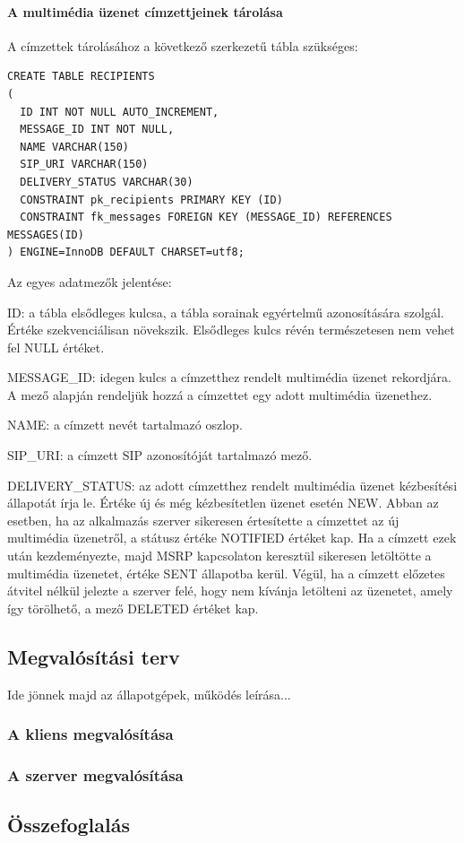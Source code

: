 \paragraph*{A multimédia üzenet címzettjeinek tárolása\\}

A címzettek tárolásához a következő szerkezetű tábla szükséges:
\fontsize{10}{10}
\begin{verbatim}
CREATE TABLE RECIPIENTS
(
  ID INT NOT NULL AUTO_INCREMENT,
  MESSAGE_ID INT NOT NULL,
  NAME VARCHAR(150)
  SIP_URI VARCHAR(150)
  DELIVERY_STATUS VARCHAR(30)
  CONSTRAINT pk_recipients PRIMARY KEY (ID)
  CONSTRAINT fk_messages FOREIGN KEY (MESSAGE_ID) REFERENCES MESSAGES(ID)
) ENGINE=InnoDB DEFAULT CHARSET=utf8;
\end{verbatim}
\fontsize{12}{12}

Az egyes adatmezők jelentése:
\begin{mydescription}
\item[ID:] a tábla elsődleges kulcsa, a tábla sorainak egyértelmű azonosítására szolgál. Értéke szekvenciálisan növekszik. Elsődleges kulcs révén természetesen nem vehet fel NULL értéket.
\item[MESSAGE\_ID:] idegen kulcs a címzetthez rendelt multimédia üzenet rekordjára. A mező alapján rendeljük hozzá a címzettet egy adott multimédia üzenethez.
\item[NAME:]  a címzett nevét tartalmazó oszlop.
\item[SIP\_URI:] a címzett SIP azonosítóját tartalmazó mező.
\item[DELIVERY\_STATUS:] az adott címzetthez rendelt multimédia üzenet kézbesítési állapotát írja le. Értéke új és még kézbesítetlen üzenet esetén NEW. Abban az esetben, ha az alkalmazás szerver sikeresen értesítette a címzettet az új multimédia üzenetről, a státusz értéke NOTIFIED értéket kap. Ha a címzett ezek után kezdeményezte, majd MSRP kapcsolaton keresztül sikeresen letöltötte a multimédia üzenetet, értéke SENT állapotba kerül. Végül, ha a címzett előzetes átvitel nélkül jelezte a szerver felé, hogy nem kívánja letölteni az üzenetet, amely így törölhető, a mező DELETED értéket kap.
\end{mydescription}

\medskip

\subsection{Megvalósítási terv}
\label{sec:megvalositas}

Ide jönnek majd az állapotgépek, működés leírása...

\subsubsection{A kliens megvalósítása}
\label{sec:kliensmegvalositas}

\subsubsection{A szerver megvalósítása}
\label{sec:szervermegvalositas}


\subsection{Összefoglalás}

